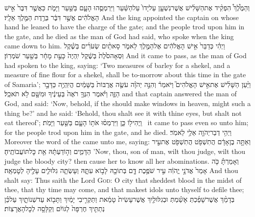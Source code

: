{וְהַמֶּ֩לֶךְ֩ הִפְקִ֨יד אֶת\maqqaf הַשָּׁלִ֜ישׁ אֲשֶׁר\maqqaf נִשְׁעָ֤ן עַל\maqqaf יָדוֹ֙ עַל\maqqaf הַשַּׁ֔עַר וַיִּרְמְסֻ֧הוּ הָעָ֛ם בַּשַּׁ֖עַר וַיָּמֹ֑ת כַּאֲשֶׁ֤ר דִּבֶּר֙ אִ֣ישׁ הָאֱלֹהִ֔ים אֲשֶׁ֣ר דִּבֶּ֔ר בְּרֶ֥דֶת הַמֶּ֖לֶךְ אֵלָֽיו׃}
{And the king appointed the captain on whose hand he leaned to have the charge of the gate; and the people trod upon him in the gate, and he died as the man of God had said, who spoke when the king came down to him.}
{וַיְהִ֗י כְּדַבֵּר֙ אִ֣ישׁ הָאֱלֹהִ֔ים אֶל\maqqaf הַמֶּ֖לֶךְ לֵאמֹ֑ר סָאתַ֨יִם שְׂעֹרִ֜ים בְּשֶׁ֗קֶל וּֽסְאָה\maqqaf סֹ֙לֶת֙ בְּשֶׁ֔קֶל יִֽהְיֶה֙ כָּעֵ֣ת מָחָ֔ר בְּשַׁ֖עַר שֹׁמְרֽוֹן׃}
{And it came to pass, as the man of God had spoken to the king, saying: ‘Two measures of barley for a shekel, and a measure of fine flour for a shekel, shall be to-morrow about this time in the gate of Samaria’;}
{וַיַּ֨עַן הַשָּׁלִ֜ישׁ אֶת\maqqaf אִ֣ישׁ הָאֱלֹהִים֮ וַיֹּאמַר֒ וְהִנֵּ֣ה יְהֹוָ֗ה עֹשֶׂ֤ה אֲרֻבּוֹת֙ בַּשָּׁמַ֔יִם הֲיִֽהְיֶ֖ה כַּדָּבָ֣ר הַזֶּ֑ה וַיֹּ֗אמֶר הִנְּךָ֤ רֹאֶה֙ בְּעֵינֶ֔יךָ וּמִשָּׁ֖ם לֹ֥א תֹאכֵֽל׃}
{and that captain answered the man of God, and said: ‘Now, behold, if the \lord\space should make windows in heaven, might such a thing be?’ and he said: ‘Behold, thou shalt see it with thine eyes, but shalt not eat thereof’;}
{וַֽיְהִי\maqqaf ל֖וֹ כֵּ֑ן וַיִּרְמְס֨וּ אֹת֥וֹ הָעָ֛ם בַּשַּׁ֖עַר וַיָּמֹֽת׃ \setuma }
{it came to pass even so unto him; for the people trod upon him in the gate, and he died.}
\label{haft_29}
\setcounter{chap}{22}
\setcounter{verse}{1}
{וַיְהִ֥י דְבַר\maqqaf יְהֹוָ֖ה אֵלַ֥י לֵאמֹֽר׃}
{Moreover the word of the \lord\space came unto me, saying:}
{וְאַתָּ֣ה בֶן\maqqaf אָדָ֔ם הֲתִשְׁפֹּ֥ט הֲתִשְׁפֹּ֖ט אֶת\maqqaf עִ֣יר הַדָּמִ֑ים וְה֣וֹדַעְתָּ֔הּ אֵ֖ת כׇּל\maqqaf תּוֹעֲבוֹתֶֽיהָ׃}
{’Now, thou, son of man, wilt thou judge, wilt thou judge the bloody city? then cause her to know all her abominations.}
{וְאָמַרְתָּ֗ כֹּ֤ה אָמַר֙ אֲדֹנָ֣י יֱהֹוִ֔ה עִ֣יר שֹׁפֶ֥כֶת דָּ֛ם בְּתוֹכָ֖הּ לָב֣וֹא עִתָּ֑הּ וְעָשְׂתָ֧ה גִלּוּלִ֛ים עָלֶ֖יהָ לְטׇמְאָֽה׃}
{And thou shalt say: Thus saith the Lord \textsc{God}: O city that sheddest blood in the midst of thee, that thy time may come, and that makest idols unto thyself to defile thee;}
{בְּדָמֵ֨ךְ אֲשֶׁר\maqqaf שָׁפַ֜כְתְּ אָשַׁ֗מְתְּ וּבְגִלּוּלַ֤יִךְ אֲשֶׁר\maqqaf עָשִׂית֙ טָמֵ֔את וַתַּקְרִ֣יבִי יָמַ֔יִךְ וַתָּב֖וֹא עַד\maqqaf שְׁנוֹתָ֑יִךְ עַל\maqqaf כֵּ֗ן נְתַתִּ֤יךְ חֶרְפָּה֙ לַגּוֹיִ֔ם וְקַלָּסָ֖ה לְכׇל\maqqaf הָאֲרָצֽוֹת׃}
